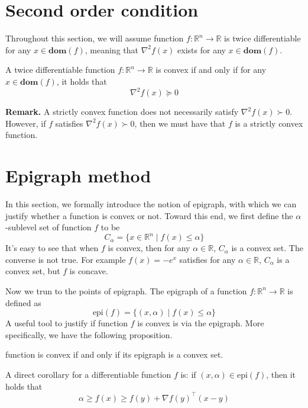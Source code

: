 \section{Second order condition}
Throughout this section, we will assume function $f: \mathbb R^n\rightarrow \mathbb R$
is twice differentiable for any $x\in \textbf{dom}(f)$,
meaning that $\nabla^2 f(x)$ exists for any $x\in \textbf{dom}(f)$.
\begin{proposition}
 A twice differentiable function $f:\mathbb R^n\rightarrow \mathbb R$ is convex if and only if for any $x\in \textbf{dom}(f)$, it holds that
\begin{equation}
\nabla^2 f(x) \succeq 0
\end{equation}
\end{proposition}
\textbf{Remark.} A strictly convex function does not necessarily satisfy $\nabla^2 f(x) \succ 0$. 
However, if $f$ satisfies $\nabla^2 f(x) \succ 0$, 
then we must have that $f$ is a strictly convex function.

\section{Epigraph method}
In this section, we formally introduce the notion of epigraph, with which we can justify whether a function is convex or not.
Toward this end, we first define the $\alpha$-sublevel set of function $f$ to be
\begin{equation}
C_\alpha=\{x\in \mathbb R^n \mid f(x)\leq \alpha\}
\end{equation}
It's easy to see that when $f$ is convex, then for any $\alpha\in \mathbb R$, $C_\alpha$ is a convex set.
The converse is not true. For example $f(x)=-e^x$ satisfies for any $\alpha\in \mathbb R$, $C_\alpha$ is a convex set,
but $f$ is concave.

Now we trun to the points of epigraph. The epigraph of a function $f:\mathbb R^n\rightarrow \mathbb R$ is defined as
\begin{equation}
\text{epi} (f)=\{(x, \alpha)\mid f(x)\leq \alpha\}
\end{equation}
A useful tool to justify if function $f$ is convex is via the epigraph. More specifically, we have the following proposition.
\begin{proposition}
function is convex if and only if its epigraph is a convex set.
\end{proposition}
A direct corollary for a differentiable function $f$ is: if $(x, \alpha)\in \text{epi}(f)$, then it holds that
\begin{equation}
\alpha \geq f(x) \geq f(y)+\nabla f(y)^\top (x-y)
\end{equation}

